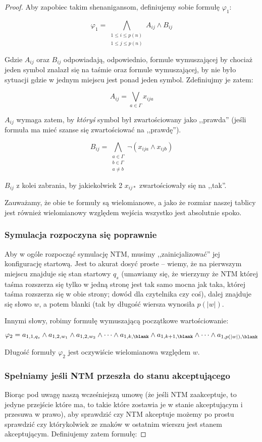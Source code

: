 \begin{proof}
	Aby zapobiec takim shenanigansom, definiujemy sobie formułę \(\varphi_1\):

	\[
		\varphi_1 = \bigwedge_{\substack{1 \leq i \leq p(n) \\ 1 \leq j \leq p(n)}} A_{ij} \land B_{ij}
	\]

	Gdzie \(A_{ij}\) oraz \(B_{ij}\) odpowiadają, odpowiednio, formule wymuszającej by chociaż jeden symbol znalazł się na taśmie oraz formule wymuszającej, by nie było sytuacji gdzie w jednym miejscu jest ponad jeden symbol. Zdefiniujmy je zatem:

	\[
		A_{ij} = \bigvee_{a \in \Gamma} x_{ija}
	\]

	\(A_{ij}\) wymaga zatem, by \textit{któryś} symbol był zwartościowany jako ,,prawda'' (jeśli formuła ma mieć szanse się zwartościować na ,,prawdę'').

	\[
		B_{ij} = \bigwedge_{\substack{a\in\Gamma \\ b\in\Gamma \\ a \not = b}} \neg(x_{ija} \land x_{ijb})
	\]

	\(B_{ij}\) z kolei zabrania, by jakiekolwiek 2 \(x_{ij*}\) zwartościowały się na ,,tak''.

	Zauważamy, że obie te formuły są wielomianowe, a jako że rozmiar naszej tablicy jest również wielomianowy względem wejścia wszystko jest absolutnie spoko.

	\subsubsection{Symulacja rozpoczyna się poprawnie}
	Aby w ogóle rozpocząć symulację NTM, musimy ,,zainicjalizować'' jej konfigurację startową. Jest to akurat dosyć proste -- wiemy, że na pierwszym miejscu znajduje się stan startowy \(q_s\) (umawiamy się, że wierzymy że NTM której taśma rozszerza się tylko w jedną stronę jest tak samo mocna jak taka, której taśma rozszerza się w obie strony; dowód dla czytelnika czy coś), dalej znajduje się słowo \(w\), a potem blanki (tak by długość wiersza wynosiła \(p(|w|)\).

	Innymi słowy, robimy formułę wymuszającą początkowe wartościowanie:

	\[
		\varphi_2 = a_{1,1, q_{s}} \land a_{1,2, w_1} \land a_{1,2, w_2} \land \dots \land a_{1, k, \blank} \land a_{1, k+1, \blank} \land \dots \land a_{1, p(|w|), \blank}
	\]

	Długość formuły \(\varphi_2\) jest oczywiście wielomianowa względem \(w\).

	\subsubsection{Spełniamy jeśli NTM przeszła do stanu akceptującego}
	Biorąc pod uwagę naszą wcześniejszą umowę (że jeśli NTM zaakceptuje, to jedyne przejście które ma, to takie które zostawia je w stanie akceptującym i przesuwa w prawo), aby sprawdzić czy NTM akceptuje możemy po prostu sprawdzić czy którykolwiek ze znaków w ostatnim wierszu jest stanem akceptującym. Definiujemy zatem formułę:


\end{proof}
